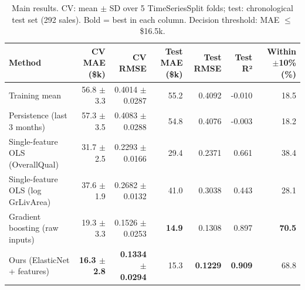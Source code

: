\begin{table}[t]
\centering
\small
\begin{tabular}{lrrrrrr}
\toprule
Method & CV MAE (\$k) & CV RMSE & Test MAE (\$k) & Test RMSE & Test R² & Within $\pm$10\% (\%) \\
\midrule
Training mean & 56.8 $\pm$ 3.3 & 0.4014 $\pm$ 0.0287 & 55.2 & 0.4092 & -0.010 & 18.5 \\
Persistence (last 3 months) & 57.3 $\pm$ 3.5 & 0.4083 $\pm$ 0.0288 & 54.8 & 0.4076 & -0.003 & 18.2 \\
Single-feature OLS (OverallQual) & 31.7 $\pm$ 2.5 & 0.2293 $\pm$ 0.0166 & 29.4 & 0.2371 & 0.661 & 38.4 \\
Single-feature OLS (log GrLivArea) & 37.6 $\pm$ 1.9 & 0.2682 $\pm$ 0.0132 & 41.0 & 0.3038 & 0.443 & 28.1 \\
Gradient boosting (raw inputs) & 19.3 $\pm$ 3.3 & 0.1526 $\pm$ 0.0253 & \textbf{14.9} & 0.1308 & 0.897 & \textbf{70.5} \\
Ours (ElasticNet + features) & \textbf{16.3 $\pm$ 2.8} & \textbf{0.1334 $\pm$ 0.0294} & 15.3 & \textbf{0.1229} & \textbf{0.909} & 68.8 \\
\bottomrule
\end{tabular}
\caption{Main results. CV: mean $\pm$ SD over 5 TimeSeriesSplit folds; test: chronological test set (292 sales). Bold = best in each column. Decision threshold: MAE $\leq$ \$16.5k.}
\label{tab:main_results}
\end{table}
